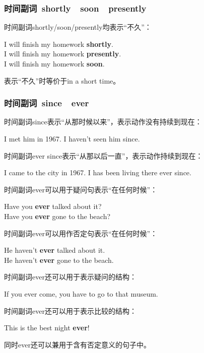 \documentclass[UTF8]{ctexart}
\newcommand{\littf}[1]{{\hspace{3pt}\ttfamily #1}}
\begin{document}
\newpage

\subsubsection{时间副词~\littf{shortly}~~\littf{soon}~~\littf{presently}}
    时间副词\littf{shortly/soon/presently}均表示“不久”：
    \begin{center}
        \large\ttfamily
        I will finish my homework \textbf{shortly}.\\[3mm]
        I will finish my homework \textbf{presently}.\\[3mm]
        I will finish my homework \textbf{soon}.\\[6mm]
    \end{center}
     表示“不久”时等价于\littf{in a short time}。\\

\subsubsection{时间副词~\littf{since}~~\littf{ever}}
    时间副词\littf{since}表示“从那时候以来”，表示动作没有持续到现在：
    \begin{center}
        \large\ttfamily
        I met him in 1967. I haven't seen him since.\\[6mm]
    \end{center}
    时间副词\littf{ever since}表示“从那以后一直”，表示动作持续到现在：
    \begin{center}
        \large\ttfamily
        I came to the city in 1967. I has been living there ever since.\\[6mm]
    \end{center}
    时间副词\littf{ever}可以用于疑问句表示“在任何时候”：
    \begin{center}
        \large\ttfamily
        Have you \textbf{ever} talked about it?\\[3mm]
        Have you \textbf{ever} gone to the beach?\\[6mm]
    \end{center}
    时间副词\littf{ever}可以用作否定句表示“在任何时候”：
    \begin{center}
        \large\ttfamily
        He haven't \textbf{ever} talked about it.\\[3mm]
        He haven't \textbf{ever} gone to the beach.\\[3mm]
    \end{center}
    时间副词\littf{ever}还可以用于表示疑问的结构：
    \begin{center}
        \large\ttfamily
        If you ever come, you have to go to that museum.\\[6mm]
    \end{center}
    时间副词\littf{ever}还可以用于表示比较的结构：
    \begin{center}
        \large\ttfamily
        This is the best night \textbf{ever}!\\[6mm]
    \end{center}
    同时\littf{ever}还可以兼用于含有否定意义的句子中。
\end{document}
